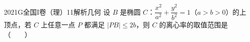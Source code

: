 
\begin{problem}{2021}{G}{全国I卷（理）}{11}{解析几何}
设 $ B $ 是椭圆 $ C $：$ \dfrac{x^2}{a^2}+\dfrac{y^2}{b^2}=1 $（$ a>b>0 $）的上顶点，若 $ C $ 上任意一点 $ P $ 都满足 $ \lvert PB\rvert\leq 2b $，则 $ C $ 的离心率的取值范围是 \hspace{1cm}（　　）
\begin{choices}
\choice{{ $ \left[\dfrac{\sqrt{2}}{2},1\right) $ }}
\choice{{ $ \left[\dfrac{1}{2},1\right) $ }}
\choice{{ $ \left(0,\dfrac{\sqrt{2}}{2}\right] $ }}
\choice{{ $ \left(0,\dfrac{1}{2}\right] $ }}
\end{choices}
\end{problem}

\begin{answer}

\end{answer}

\begin{solutions}

\end{solutions}